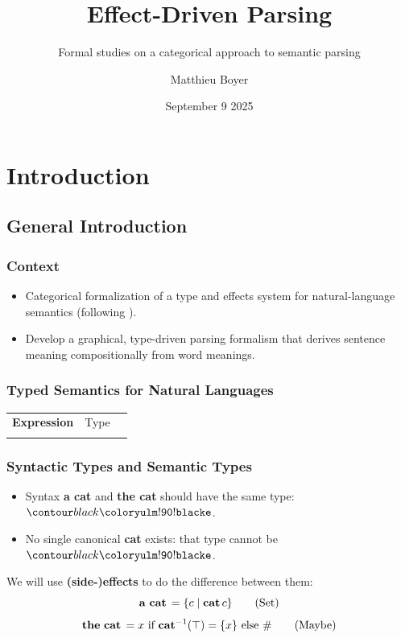 \documentclass[math, english, info]{beamercours}
\title{Effect-Driven Parsing}
\subtitle{Formal studies on a categorical approach to semantic parsing}
\institute{École Normale Supérieure | Yale University}
\author{Matthieu Boyer}
\date{September 9 2025}
\begin{document}
\fancytitleframe

\section{Introduction}
\subsection{General Introduction}
\begin{frame}
	\frametitle{Context}
	\begin{itemize}
		\item Categorical formalization of a type and effects system for
		      natural-language semantics
		      (following \cite{bumfordEffectdrivenInterpretationFunctors2025}).

		\item Develop a graphical, type-driven parsing formalism that
		      derives sentence meaning compositionally from word meanings.
	\end{itemize}
\end{frame}

\begin{frame}[fragile]
	\frametitle{Typed Semantics for Natural Languages}
	\begin{center}
		\setcellgapes{3pt}
		\makegapedcells
		\begin{NiceTabular}{>{\bf}LLL}
			Expression & \rm Type & \lambda{} \\
			\CodeAfter
		\end{NiceTabular}
	\end{center}
\end{frame}

\begin{frame}[fragile]
	\frametitle{Syntactic Types and Semantic Types}
	\begin{itemize}
		\item Syntax \textbf{a cat} and \textbf{the cat} should have the same type: $\e$.
		      \pause
		\item No single canonical \textbf{cat} exists: that type cannot be $\e$.
	\end{itemize}
	\pause

	We will use \textbf{(side-)effects} to do the difference between them:
	\begin{equation*}
		\mathbf{a\ cat}\, = \{c \mid \mathbf{cat}\, c\} \tag{Set}
	\end{equation*}
	\begin{equation*}
		\mathbf{the\ cat}\, = x \text{ if } \mathbf{cat}^{-1}(\top) = \{x\} \text{ else } \# \tag{Maybe}
	\end{equation*}
\end{frame}
\end{document}

